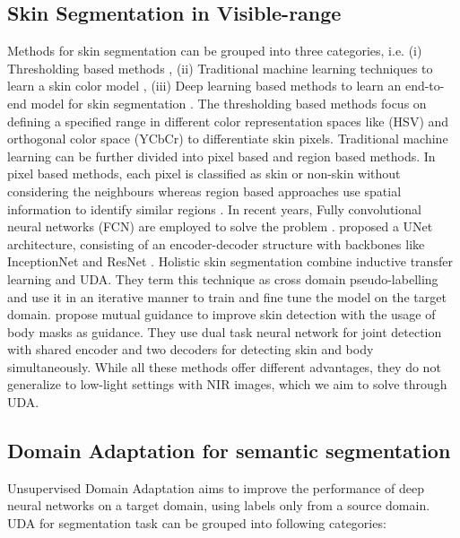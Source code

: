 \documentclass[runningheads]{llncs}
\begin{document}
\subsection{Skin Segmentation in Visible-range}
Methods for skin segmentation can be grouped into three categories, i.e. (i) Thresholding based methods \cite{kovac2003human, erdem2011combining, qiang2010robust}, (ii) Traditional machine learning techniques to learn a skin color model \cite{liu2010robust ,zaidan2014multi}, (iii) Deep learning based methods to learn an end-to-end model for skin segmentation \cite{al2013impact , wu2012skin , seow2003neural , chen2016skin , he2019semi}.  
The thresholding based methods focus  on  defining  a  specified  range  in  different color  representation spaces like (HSV)\cite{moallem2011novel} and orthogonal color space (YCbCr)\cite{hsu2002face,brancati2017human} to differentiate skin pixels. Traditional machine learning can be further divided into pixel based and region based methods. In pixel based methods, each pixel is classified as skin or non-skin without considering the neighbours \cite{taqa2010increasing} whereas region based approaches use spatial information to identify similar regions \cite{chen2007region}. 
In recent years, Fully convolutional neural networks (FCN) are employed to solve the problem \cite{long2015fully}.
\cite{ronneberger2015u} proposed a UNet architecture, consisting of an encoder-decoder structure with backbones like InceptionNet\cite{szegedy2016rethinking} and ResNet \cite{he2016deep}.
Holistic skin segmentation \cite{dourado2019domain} combine inductive transfer learning and UDA. They term this technique as cross domain pseudo-labelling and use it in an iterative manner  to  train and fine tune the model on the target domain. 
\cite{he2019semi} propose mutual guidance to improve skin detection with the usage of body masks as guidance. They use dual task neural network for joint detection with shared encoder and two decoders for detecting skin and body simultaneously. While all these methods offer different advantages, they do not generalize to low-light settings with NIR images, which we aim to solve through UDA. 
\subsection{Domain Adaptation for semantic segmentation}
Unsupervised Domain Adaptation aims to improve the performance  of deep neural networks on a target domain, using labels only from a source domain. UDA for segmentation task can be grouped into following  categories:
\end{document}
